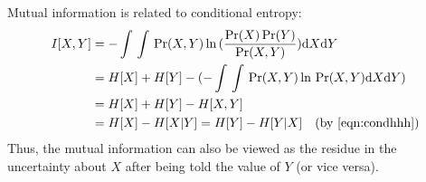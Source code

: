 Mutual information is related to conditional entropy:
\begin{equation}
\begin{split}
I[X,Y]&=-\int{}\int{}\Pr(X,Y)\ln{}(\frac{\Pr(X)\Pr(Y)}{\Pr(X,Y)})\text{d}X\text{d}Y\\
&=H[X]+H[Y]-(-\int{}\int{}\Pr(X,Y)\ln{}\Pr(X,Y)\text{d}X\text{d}Y)\\
&=H[X]+H[Y]-H[X,Y]\\
&=H[X]-H[X\vert{}Y]=H[Y]-H[Y\vert{}X]\quad{}\text{(by
    \eqref{eqn:condhhh})}
\end{split}
\end{equation}
Thus, the mutual information can also be viewed as the residue in
the uncertainty about $X$ after being told the value of $Y$ (or vice
        versa).
